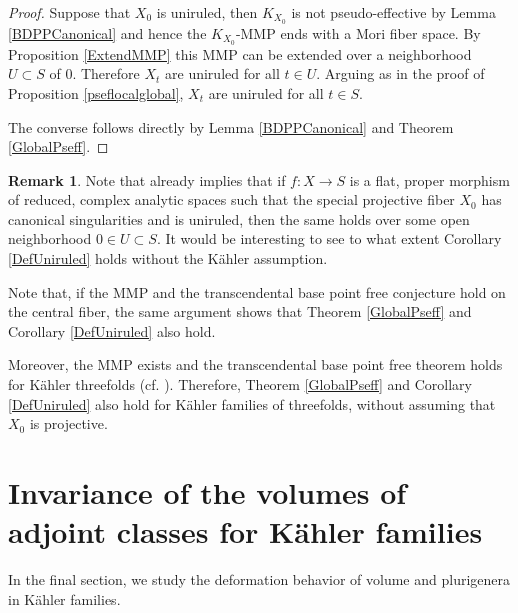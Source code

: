 \documentclass[12pt]{amsart}
\numberwithin{equation}{section}
\theoremstyle{definition}
\theoremstyle{plain}
\newtheorem*{thm A*}{Theorem A}
\newtheorem*{thm B*}{Theorem B}
\newtheorem*{thm C*}{Theorem C}
\newtheorem*{thm D*}{Theorem D}
\theoremstyle{definition}
\newtheorem{remark}  [theorem]     {Remark}
\renewcommand{\1}{\mathds{1}}
\renewcommand{\>}{\rightarrow}
\begin{document}
\begin{proof}%
Suppose that $X_0$ is uniruled, then $K_{X_0}$ is not pseudo-effective by Lemma \ref{BDPPCanonical}  and hence the $K_{X_0}$-MMP ends with a Mori fiber space. By Proposition \ref{ExtendMMP}  this MMP can be extended over a neighborhood $U\subset S$ of $0$. Therefore $X_t$ are uniruled for all $t\in U$.
Arguing as in the proof of Proposition \ref{pseflocalglobal}, $X_t$ are uniruled  for all $t\in S$.

The converse follows directly by Lemma \ref{BDPPCanonical} and Theorem  \ref{GlobalPseff}.
\end{proof}


\begin{remark}\label{Remark: Psef3fold}
Note that \cite[Theorem 2]{DefGeneralType} already implies that if $f:X\to S$ is a flat, proper morphism of reduced, complex analytic
spaces such that the special projective fiber $X_0$ has canonical singularities and is uniruled, then the same holds over some open neighborhood $0\in U\subset S$. It would be interesting to see to what extent Corollary \ref{DefUniruled} holds without the K\"ahler assumption.


Note that, if the MMP and the transcendental base point free conjecture hold on the central fiber, the same argument 
shows that Theorem \ref{GlobalPseff} and Corollary \ref{DefUniruled} also hold.

Moreover, the MMP exists and the transcendental base point free theorem holds for K\"ahler threefolds (cf. \cite{DH24}). Therefore, Theorem \ref{GlobalPseff} and Corollary \ref{DefUniruled} also hold for K\"ahler families of threefolds, without assuming that $X_0$ is projective.
\end{remark}


\section{Invariance of the volumes of adjoint classes for K\"ahler families}\label{Section: DeformationVol}
In the final section, we study the deformation behavior of volume and plurigenera in K\"ahler families.
\end{document}
